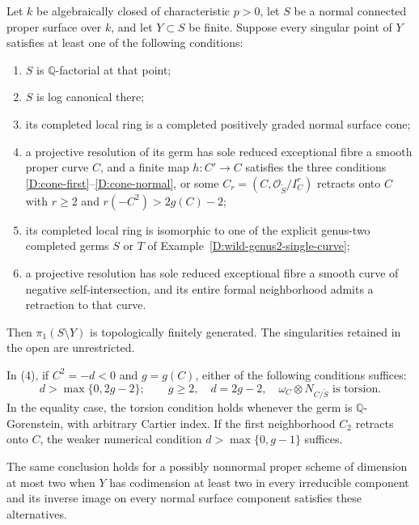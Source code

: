 \begin{theorem}
\label{D:finite-cone-mixed-boundary}
Let $k$ be algebraically closed of characteristic $p>0$, let
$S$ be a normal connected proper surface over $k$, and let
$Y\subset S$ be finite.  Suppose every singular point of $Y$
satisfies at least one of the following conditions:
\begin{enumerate}
\item $S$ is $\mathbb Q$-factorial at that point;
\item $S$ is log canonical there;
\item its completed local ring is a completed positively graded
      normal surface cone;
\item a projective resolution of its germ has sole reduced
      exceptional fibre a smooth proper curve $C$, and a finite
      map $h:C'\to C$ satisfies the three conditions
      \eqref{D:cone-first}--\eqref{D:cone-normal}, or some
      $C_r=(C,\mathcal O_{\widetilde S}/I_C^r)$ retracts onto
      $C$ with $r\geq2$ and $r(-C^2)>2g(C)-2$;
\item its completed local ring is isomorphic to one of the
      explicit genus-two completed germs $S$ or $T$ of
      Example~\ref{D:wild-genus2-single-curve};
\item a projective resolution has sole reduced exceptional
      fibre a smooth curve of negative self-intersection, and
      its entire formal neighborhood admits a retraction to
      that curve.
\end{enumerate}
Then $\pi_1(S\setminus Y)$ is topologically finitely generated.
The singularities retained in the open are unrestricted.

In (4), if $C^2=-d<0$ and $g=g(C)$, either of the following
conditions suffices:
\[
 d>\max\{0,2g-2\};\qquad
 g\geq2,\quad d=2g-2,\quad
 \omega_C\otimes N_{C/\widetilde S}\text{ is torsion}.
\]
In the equality case, the torsion condition holds whenever
the germ is $\mathbb Q$-Gorenstein, with arbitrary Cartier index.
If the first neighborhood $C_2$ retracts onto $C$, the weaker
numerical condition $d>\max\{0,g-1\}$ suffices.

The same conclusion holds for a possibly nonnormal proper
scheme of dimension at most two when $Y$ has codimension at
least two in every irreducible component and its inverse image
on every normal surface component satisfies these alternatives.
\end{theorem}

